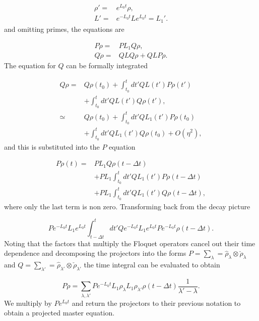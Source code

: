\documentclass[reprint, amsmath,amssymb, aps,pra]{revtex4-1}
\begin{document}
\begin{align*}
 \rho' =& e^{L_0t}\rho,\\
 L' =& e^{-L_0t}Le^{L_0t} = L_1'.
\end{align*} and omitting primes, the equations are

\begin{align*}
P\dot{\rho} =& PL_1Q\rho, \\
Q\dot{\rho} =& QLQ\rho + QLP\rho.
\end{align*} The equation for $Q$ can be formally integrated \cite{TesisMaestria}

\begin{align*}
Q\rho =& Q\rho(t_0) + \int_{t_0}^{t}dt' QL(t')P\rho(t')\\
       &+\int_{t_0}^{t}dt'QL(t')Q\rho(t'),\\
\simeq & Q\rho(t_0) + \int_{t_0}^{t}dt' QL_1(t')P\rho(t_0)\\
       &+\int_{t_0}^{t}dt'QL_1(t')Q\rho(t_0)+O(\eta^2),
\end{align*} and this is substituted into the $P$ equation

\begin{align}
P\dot{\rho}(t) =& PL_1Q\rho(t-\Delta t)\\ 
 &+ PL_1\int_{t_0}^{t}dt' QL_1(t')P\rho(t-\Delta t)\nonumber \\
 &+ PL_1\int_{t_0}^{t}dt'QL_1(t')Q\rho(t-\Delta t) \nonumber,
\end{align} where only the last term is non zero. Transforming back from the decay picture

\begin{equation}\label{ProyectionEQ}
P e^{-L_0 t}L_1e^{L_0 t}\int_{t-\Delta t}^{t}dt'Qe^{-L_0 t}L_1e^{L_0 t}Pe^{-L_0 t}\rho(t-\Delta t).
\end{equation} Noting that the factors that multiply the Floquet operators cancel out their time dependence and decomposing the projectors into the forms $P=\sum_\lambda = \hat{\rho}_\lambda \otimes \check{\rho}_\lambda$ and $Q=\sum_{\lambda'} = \hat{\rho}_{\lambda'} \otimes \check{\rho}_{\lambda'}$ the time integral can be evaluated to obtain

\begin{equation}
P\dot{\rho}=\sum_{\lambda ,\lambda'} P e^{-L_0 t} L_1 \rho_{\lambda} L_1 \rho_{\lambda'} \rho(t-\Delta t)\frac{1}{\lambda' - \lambda} .
\end{equation} We multiply by $Pe^{L_0 t}$ and return the projectors to their previous notation to obtain a projected master equation.





\end{document}
